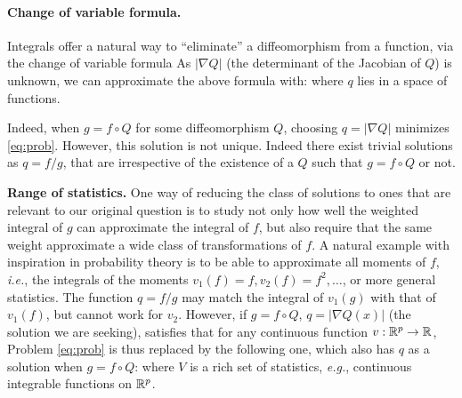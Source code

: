 \paragraph{Change of variable formula.} Integrals offer a natural way to ``eliminate'' a diffeomorphism from a function, via the change of variable formula
As $|\nabla Q|$ (the determinant of the Jacobian of $Q$) is unknown, we can approximate the above formula with:
 where $q$ lies in a space of functions.

Indeed, when $g = f\circ Q$ for some diffeomorphism $Q$, choosing $q = \vert\nabla Q\vert$ minimizes \eqref{eq:prob}. However, this solution is not unique. Indeed there exist trivial solutions as $q = f / g$, that are irrespective of the existence of a $Q$ such that $g=f\circ Q$ or not.

\textbf{Range of statistics.} One way of reducing the class of solutions to ones that are relevant to our original question is to study not only how well the weighted integral of $g$ can approximate the integral of $f$, but also require that the same weight approximate a wide class of transformations of $f$. A natural example with inspiration in probability theory is to be able to approximate all moments of $f$, \emph{i.e.}, the integrals of the moments $v_1(f) = f, v_2(f) = f^2, \dots$, or more general statistics. The function $q = f / g$ may match the integral of $v_1(g)$ with that of $v_1(f)$, but cannot work for $v_2$. However, if $g = f\circ Q$, $q = |\nabla Q(x)|$ (the solution we are seeking), satisfies that for any continuous function $v: \mathbb R^p \to \mathbb R$,
Problem \eqref{eq:prob} is thus replaced by the following one, which also has $q$ as a solution when $g = f \circ Q$:
 where $V$ is a rich set of statistics, \emph{e.g.}, continuous integrable functions on $\mathbb R^p$.



